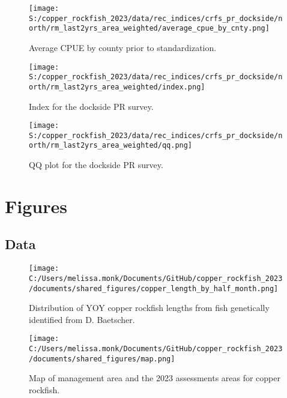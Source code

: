 \documentclass[
  letterpaper,
]{article}
\begin{document}
\begin{figure}
\centering
\texttt{[image: S:/copper\_rockfish\_2023/data/rec\_indices/crfs\_pr\_dockside/north/rm\_last2yrs\_area\_weighted/average\_cpue\_by\_cnty.png]}
\caption{Average CPUE by county prior to standardization.\label{fig:pr-districtcpue}}
\end{figure}

\newpage

\begin{figure}
\centering
\texttt{[image: S:/copper\_rockfish\_2023/data/rec\_indices/crfs\_pr\_dockside/north/rm\_last2yrs\_area\_weighted/index.png]}
\caption{Index for the dockside PR survey.\label{fig:pr-index}}
\end{figure}

\newpage

\begin{figure}
\centering
\texttt{[image: S:/copper\_rockfish\_2023/data/rec\_indices/crfs\_pr\_dockside/north/rm\_last2yrs\_area\_weighted/qq.png]}
\caption{QQ plot for the dockside PR survey.\label{fig:pr-qq}}
\end{figure}

\newpage

\clearpage

\hypertarget{figures}{%
\section{Figures}\label{figures}}

\hypertarget{data}{%
\subsection{Data}\label{data}}

\begin{figure}
\centering
\texttt{[image: C:/Users/melissa.monk/Documents/GitHub/copper\_rockfish\_2023/documents/shared\_figures/copper\_length\_by\_half\_month.png]}
\caption{Distribution of YOY copper rockfish lengths from fish genetically identified from D. Baetscher.\label{fig:copper-smurf-length}}
\end{figure}

\pagebreak

\begin{figure}
\centering
\texttt{[image: C:/Users/melissa.monk/Documents/GitHub/copper\_rockfish\_2023/documents/shared\_figures/map.png]}
\caption{Map of management area and the 2023 assessments areas for copper rockfish.\label{fig:ca-map}}
\end{figure}
\end{document}
